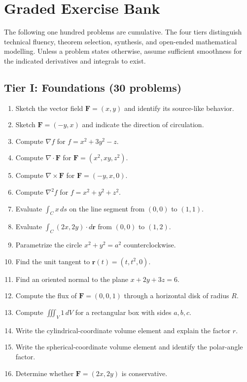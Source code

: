 \section{Graded Exercise Bank}
\label{sec:ch3-exercises}

The following one hundred problems are cumulative.  The four tiers distinguish
technical fluency, theorem selection, synthesis, and open-ended mathematical
modelling.  Unless a problem states otherwise, assume sufficient smoothness for
the indicated derivatives and integrals to exist.

\subsection*{Tier I: Foundations (30 problems)}
\begin{enumerate}[label=\textbf{\arabic*.},leftmargin=*]
\item Sketch the vector field $\mathbf F=(x,y)$ and identify its source-like behavior.
\item Sketch $\mathbf F=(-y,x)$ and indicate the direction of circulation.
\item Compute $\nabla f$ for $f=x^2+3y^2-z$.
\item Compute $\nabla\cdot\mathbf F$ for $\mathbf F=(x^2,xy,z^2)$.
\item Compute $\nabla\times\mathbf F$ for $\mathbf F=(-y,x,0)$.
\item Compute $\nabla^2 f$ for $f=x^2+y^2+z^2$.
\item Evaluate $\int_C x\,ds$ on the line segment from $(0,0)$ to $(1,1)$.
\item Evaluate $\int_C (2x,2y)\cdot d\mathbf r$ from $(0,0)$ to $(1,2)$.
\item Parametrize the circle $x^2+y^2=a^2$ counterclockwise.
\item Find the unit tangent to $\mathbf r(t)=(t,t^2,0)$.
\item Find an oriented normal to the plane $x+2y+3z=6$.
\item Compute the flux of $\mathbf F=(0,0,1)$ through a horizontal disk of radius $R$.
\item Compute $\iiint_V 1\,dV$ for a rectangular box with sides $a,b,c$.
\item Write the cylindrical-coordinate volume element and explain the factor $r$.
\item Write the spherical-coordinate volume element and identify the polar-angle factor.
\item Determine whether $\mathbf F=(2x,2y)$ is conservative.

\end{enumerate}
